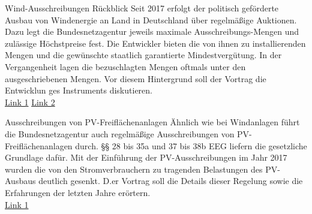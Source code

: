 \documentclass[10pt,aspectratio=169,dvipsnames]{beamer}
\begin{document}
\begin{frame}
    \begin{block}{Wind-Ausschreibungen Rückblick}
    Seit 2017 erfolgt der politisch geförderte Ausbau von Windenergie an Land in Deutschland über regelmäßige Auktionen. Dazu legt die Bundesnetzagentur jeweils maximale Ausschreibungs-Mengen und zulässige Höchstpreise fest. Die Entwickler bieten die von ihnen zu installierenden Mengen und die gewünschte staatlich garantierte Mindestvergütung. In der Vergangenheit lagen die bezuschlagten Mengen oftmals unter den ausgeschriebenen Mengen. Vor diesem Hintergrund soll der Vortrag die Entwicklun ges Instruments diskutieren.\\
    \href{https://www.bundesnetzagentur.de/DE/Fachthemen/EektrizitaetundGas/Ausschreibungen/start.html}{Link 1}
    \href{https://www.wirtschaftsdienst.eu/inhalt/jahr/2023/heft/2/beitrag/gebotskostenfoerderung-in-windenergie-auktionen.html}{Link 2}
    \end{block}
    \begin{block}{Ausschreibungen von PV-Freiflächenanlagen}
    Ähnlich wie bei Windanlagen führt die Bundesnetzagentur auch regelmäßige Ausschreibungen von PV-Freiflächenanlagen durch. §§ 28 bis 35a und 37 bis 38b EEG liefern die gesetzliche Grundlage dafür. Mit der Einführung der PV-Ausschreibungen im Jahr 2017 wurden die von den Stromverbrauchern zu tragenden Belastungen des PV-Ausbaus deutlich gesenkt. D.er Vortrag soll die Details dieser Regelung sowie die Erfahrungen der letzten Jahre erörtern.\\
    \href{https://www.bundesnetzagentur.de/DE/Fachthemen/ElektrizitaetundGas/Ausschreibungen/Solaranlagen1/start.html}{Link 1}
    \end{block}
\end{frame}
\end{document}

